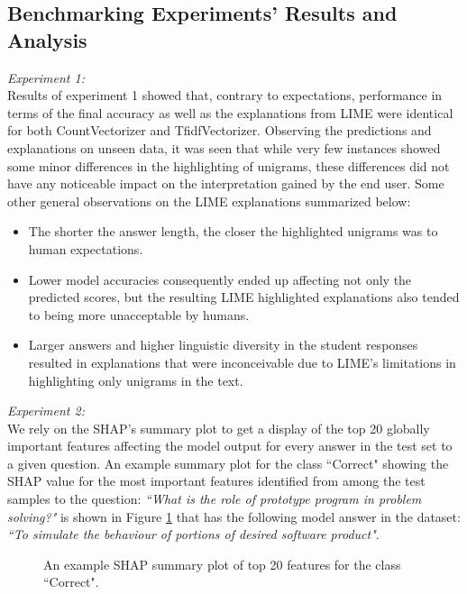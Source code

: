 \documentclass[letterpaper, 10 pt, conference]{ieeeconf}  %
\begin{document}
\subsection{Benchmarking Experiments' Results and Analysis}
\textit{Experiment 1:}\\
Results of experiment 1 showed that, contrary to expectations, performance in terms of the final accuracy as well as the explanations from LIME were identical for both CountVectorizer and TfidfVectorizer. Observing the predictions and explanations on unseen data, it was seen that while very few instances showed some minor differences in the highlighting of unigrams, these differences did not have any noticeable impact on the interpretation gained by the end user. Some other general observations on the LIME explanations summarized below:
\begin{itemize}
\item The shorter the answer length, the closer the highlighted unigrams was to human expectations. 
\item Lower model accuracies consequently ended up affecting not only the predicted scores, but the resulting LIME highlighted explanations also tended to being more unacceptable by humans.
\item Larger answers and higher linguistic diversity in the student responses resulted in explanations that were inconceivable due to LIME's limitations in highlighting only unigrams in the text.
\end{itemize}
\textit{Experiment 2:}\\
We rely on the SHAP's summary plot to get a display of the top 20 globally important features affecting the model output for every answer in the test set to a given question. An example summary plot for the class ``Correct" showing the SHAP value for the most important features identified from among the test samples to the question: \textit{``What is the role of prototype program in problem solving?"} is shown in Figure \ref{fig:shap1} that has the following model answer in the dataset: \textit{``To simulate the behaviour of portions of desired software product"}. 
\begin{figure}[H]
\caption{An example SHAP summary plot of top 20 features for the class ``Correct".}
\label{fig:shap1}
\end{figure}
\end{document}
